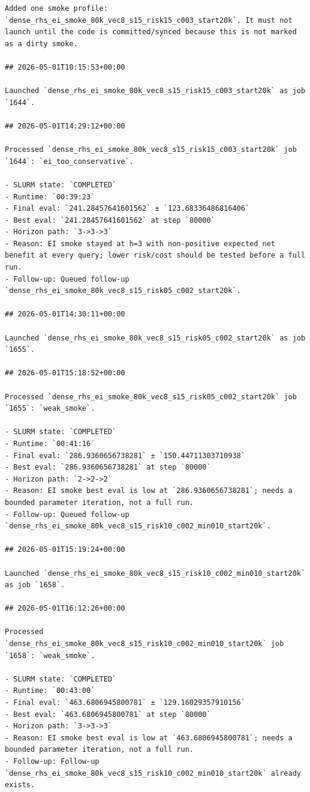 \begin{verbatim}
Added one smoke profile: `dense_rhs_ei_smoke_80k_vec8_s15_risk15_c003_start20k`. It must not launch until the code is committed/synced because this is not marked as a dirty smoke.

## 2026-05-01T10:15:53+00:00

Launched `dense_rhs_ei_smoke_80k_vec8_s15_risk15_c003_start20k` as job `1644`.

## 2026-05-01T14:29:12+00:00

Processed `dense_rhs_ei_smoke_80k_vec8_s15_risk15_c003_start20k` job `1644`: `ei_too_conservative`.

- SLURM state: `COMPLETED`
- Runtime: `00:39:23`
- Final eval: `241.28457641601562` ± `123.68336486816406`
- Best eval: `241.28457641601562` at step `80000`
- Horizon path: `3->3->3`
- Reason: EI smoke stayed at h=3 with non-positive expected net benefit at every query; lower risk/cost should be tested before a full run.
- Follow-up: Queued follow-up `dense_rhs_ei_smoke_80k_vec8_s15_risk05_c002_start20k`.

## 2026-05-01T14:30:11+00:00

Launched `dense_rhs_ei_smoke_80k_vec8_s15_risk05_c002_start20k` as job `1655`.

## 2026-05-01T15:18:52+00:00

Processed `dense_rhs_ei_smoke_80k_vec8_s15_risk05_c002_start20k` job `1655`: `weak_smoke`.

- SLURM state: `COMPLETED`
- Runtime: `00:41:16`
- Final eval: `286.9360656738281` ± `150.44711303710938`
- Best eval: `286.9360656738281` at step `80000`
- Horizon path: `2->2->2`
- Reason: EI smoke best eval is low at `286.9360656738281`; needs a bounded parameter iteration, not a full run.
- Follow-up: Queued follow-up `dense_rhs_ei_smoke_80k_vec8_s15_risk10_c002_min010_start20k`.

## 2026-05-01T15:19:24+00:00

Launched `dense_rhs_ei_smoke_80k_vec8_s15_risk10_c002_min010_start20k` as job `1658`.

## 2026-05-01T16:12:26+00:00

Processed `dense_rhs_ei_smoke_80k_vec8_s15_risk10_c002_min010_start20k` job `1658`: `weak_smoke`.

- SLURM state: `COMPLETED`
- Runtime: `00:43:00`
- Final eval: `463.6806945800781` ± `129.16029357910156`
- Best eval: `463.6806945800781` at step `80000`
- Horizon path: `3->3->3`
- Reason: EI smoke best eval is low at `463.6806945800781`; needs a bounded parameter iteration, not a full run.
- Follow-up: Follow-up `dense_rhs_ei_smoke_80k_vec8_s15_risk10_c002_min010_start20k` already exists.


\end{verbatim}
